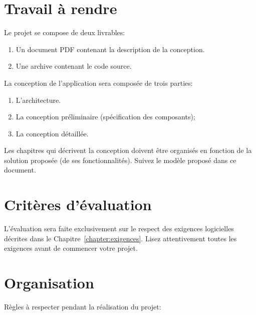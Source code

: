 \documentclass[a4]{report}
\begin{document}
\section{Travail à rendre}
Le projet se compose de deux livrables:
\begin{enumerate}
	\item Un document PDF contenant la description de la conception.
	\item Une archive contenant le code source.
\end{enumerate}

La conception de l'application sera composée de trois parties:
\begin{enumerate}
	\item L'architecture.
	\item La conception préliminaire (spécification des composants);
	\item La conception détaillée.
\end{enumerate} 

Les chapitres qui décrivent la conception doivent être organisés en fonction de la solution proposée (de ses fonctionnalités).
Suivez le modèle proposé dans ce document.


\section{Critères d'évaluation}

L'évaluation sera faite exclusivement sur le respect des exigences logicielles décrites dans le Chapitre~\ref{chapter:exigences}.
Lisez attentivement toutes les exigences avant de commencer votre projet.

\section{Organisation}

Règles à respecter pendant la réalisation du projet:
\end{document}
